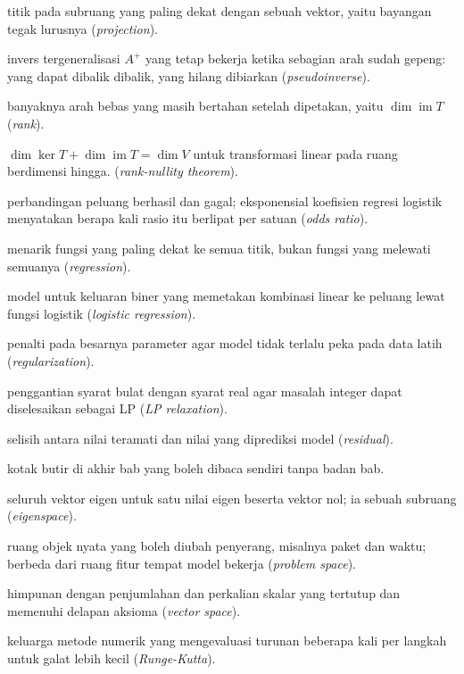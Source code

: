 \documentclass[11pt,a4paper,oneside]{book}
\theoremstyle{definition}
\theoremstyle{plain}
\theoremstyle{remark}
\begin{document}
\begin{description}[style=nextline,itemsep=0.35em]
  \item[Proyeksi] titik pada subruang yang paling dekat dengan sebuah vektor, yaitu bayangan tegak lurusnya (\emph{projection}).
  \item[Pseudoinvers] invers tergeneralisasi $A^{+}$ yang tetap bekerja ketika sebagian arah sudah gepeng: yang dapat dibalik dibalik, yang hilang dibiarkan (\emph{pseudoinverse}).
  \item[Rank] banyaknya arah bebas yang masih bertahan setelah dipetakan, yaitu $\dim\operatorname{im}T$ (\emph{rank}).
  \item[Rank-nullity] $\dim\ker T+\dim\operatorname{im}T=\dim V$ untuk transformasi linear pada ruang berdimensi hingga. (\emph{rank-nullity theorem}).
  \item[Rasio peluang] perbandingan peluang berhasil dan gagal; eksponensial koefisien regresi logistik menyatakan berapa kali rasio itu berlipat per satuan (\emph{odds ratio}).
  \item[Regresi] menarik fungsi yang paling dekat ke semua titik, bukan fungsi yang melewati semuanya (\emph{regression}).
  \item[Regresi logistik] model untuk keluaran biner yang memetakan kombinasi linear ke peluang lewat fungsi logistik (\emph{logistic regression}).
  \item[Regularisasi] penalti pada besarnya parameter agar model tidak terlalu peka pada data latih (\emph{regularization}).
  \item[Relaksasi LP] penggantian syarat bulat dengan syarat real agar masalah integer dapat diselesaikan sebagai LP (\emph{LP relaxation}).
  \item[Residu] selisih antara nilai teramati dan nilai yang diprediksi model (\emph{residual}).
  \item[Ringkasan] kotak butir di akhir bab yang boleh dibaca sendiri tanpa badan bab.
  \item[Ruang eigen] seluruh vektor eigen untuk satu nilai eigen beserta vektor nol; ia sebuah subruang (\emph{eigenspace}).
  \item[Ruang masalah] ruang objek nyata yang boleh diubah penyerang, misalnya paket dan waktu; berbeda dari ruang fitur tempat model bekerja (\emph{problem space}).
  \item[Ruang vektor] himpunan dengan penjumlahan dan perkalian skalar yang tertutup dan memenuhi delapan aksioma (\emph{vector space}).
  \item[Runge-Kutta] keluarga metode numerik yang mengevaluasi turunan beberapa kali per langkah untuk galat lebih kecil (\emph{Runge-Kutta}).

\end{description}
\end{document}
